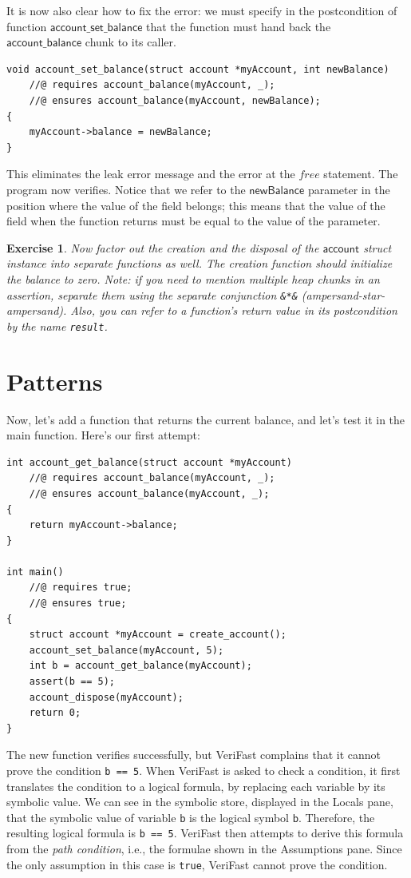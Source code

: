 \documentclass{article}
\newtheorem{exercise}{Exercise}
\begin{document}
It is now also clear how to fix the error: we must specify in
the postcondition of function $\mathsf{account\_set\_balance}$
that the function must hand back the
$\mathsf{account\_balance}$ chunk to its caller.
\begin{lstlisting}
void account_set_balance(struct account *myAccount, int newBalance)
    //@ requires account_balance(myAccount, _);
    //@ ensures account_balance(myAccount, newBalance);
{
    myAccount->balance = newBalance;
}
\end{lstlisting}
 This
eliminates the leak error message and the error at the
$\mathit{free}$ statement. The program now verifies. Notice
that we refer to the $\mathsf{newBalance}$ parameter in the
position where the value of the field belongs; this means that
the value of the field when the function returns must be equal
to the value of the parameter.

\begin{exercise}\label{exercise:account}
Now factor out the creation and the disposal of the
$\mathsf{account}$ struct instance into separate functions as
well. The creation function should initialize the balance to
zero. Note: if you need to mention multiple heap chunks in an
assertion, separate them using the \emph{separate conjunction}
\lstinline!&*&! (ampersand-star-ampersand). Also, you can refer
to a function's return value in its postcondition by the name
\lstinline!result!.
\end{exercise}

\section{Patterns}

Now, let's add a function that returns the current balance, and
let's test it in the main function. Here's our first attempt:

\begin{lstlisting}
int account_get_balance(struct account *myAccount)
    //@ requires account_balance(myAccount, _);
    //@ ensures account_balance(myAccount, _);
{
    return myAccount->balance;
}

int main()
    //@ requires true;
    //@ ensures true;
{
    struct account *myAccount = create_account();
    account_set_balance(myAccount, 5);
    int b = account_get_balance(myAccount);
    assert(b == 5);
    account_dispose(myAccount);
    return 0;
}
\end{lstlisting}

The new function verifies successfully, but VeriFast complains
that it cannot prove the condition \lstinline!b == 5!. When
VeriFast is asked to check a condition, it first translates the
condition to a logical formula, by replacing each variable by
its symbolic value. We can see in the symbolic store, displayed
in the Locals pane, that the symbolic value of variable
$\mathsf{b}$ is the logical symbol $\mathsf{b}$. Therefore, the
resulting logical formula is \lstinline!b == 5!. VeriFast then
attempts to derive this formula from the \emph{path condition},
i.e., the formulae shown in the Assumptions pane. Since the
only assumption in this case is \lstinline!true!, VeriFast
cannot prove the condition.
\end{document}
